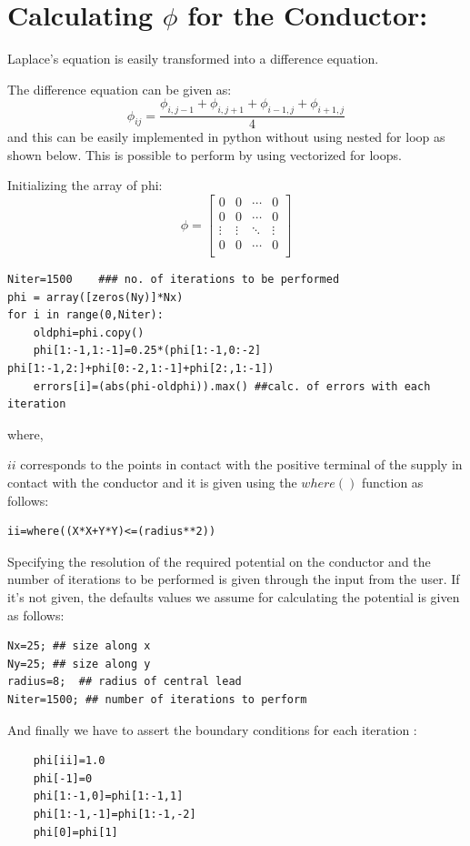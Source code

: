\documentclass[10pt,english, openany]{book}
\begin{document}
\section{Calculating $\phi$ for the Conductor:}
Laplace’s equation is easily transformed into a difference equation.\par
The difference equation can be given as:
\begin{equation*}
\phi_{ij}=\frac{\phi_{i,j-1}+\phi_{i,j+1}+\phi_{i-1,j}+\phi_{i+1,j}}{4}
\end{equation*}and this can be easily implemented in python without using nested for loop as shown below. This is possible to perform by using vectorized for loops.\par
Initializing the array of phi:
\begin{equation}
\phi=\begin{bmatrix} 
      	0 & 0 & \cdots & 0 \\
        	0 & 0 & \cdots & 0 \\
            \vdots & \vdots & \ddots & \vdots \\
            0 & 0 & \cdots & 0 \\
        \end{bmatrix}
\end{equation}
\begin{verbatim}
Niter=1500    ### no. of iterations to be performed
phi = array([zeros(Ny)]*Nx)
for i in range(0,Niter):
	oldphi=phi.copy()
	phi[1:-1,1:-1]=0.25*(phi[1:-1,0:-2] phi[1:-1,2:]+phi[0:-2,1:-1]+phi[2:,1:-1])
	errors[i]=(abs(phi-oldphi)).max() ##calc. of errors with each iteration
\end{verbatim}
where, \par
$ii$ corresponds to the points in contact with the positive terminal of the supply in contact with the conductor and it is given using the $where()$ function as follows:

\begin{verbatim}
ii=where((X*X+Y*Y)<=(radius**2))
\end{verbatim}

\par
Specifying the resolution of the required potential on the conductor and the number of iterations to be performed is given through the input from the user. If it's not given, the defaults values we assume for calculating the potential is given as follows:
\begin{verbatim}
Nx=25; ## size along x
Ny=25; ## size along y
radius=8;  ## radius of central lead
Niter=1500; ## number of iterations to perform
\end{verbatim}
\par
And finally we have to assert the boundary conditions for each iteration :
\begin{verbatim}
	phi[ii]=1.0
	phi[-1]=0
	phi[1:-1,0]=phi[1:-1,1]
	phi[1:-1,-1]=phi[1:-1,-2]
	phi[0]=phi[1]
\end{verbatim}
\begingroup
\end{document}
